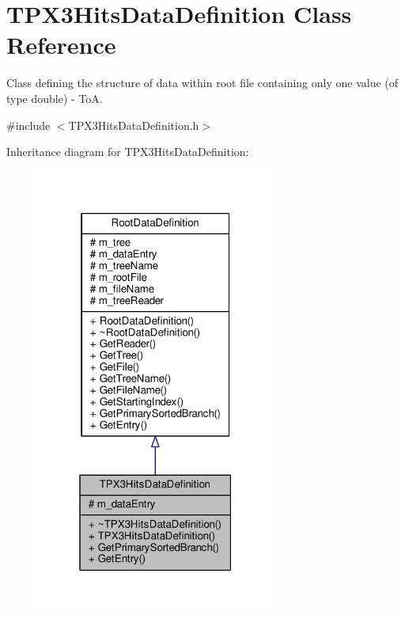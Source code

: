 \hypertarget{classTPX3HitsDataDefinition}{\section{T\+P\+X3\+Hits\+Data\+Definition Class Reference}
\label{classTPX3HitsDataDefinition}
}


Class defining the structure of data within root file containing only one value (of type double) -\/ To\+A.  




{\ttfamily \#include $<$T\+P\+X3\+Hits\+Data\+Definition.\+h$>$}



Inheritance diagram for T\+P\+X3\+Hits\+Data\+Definition\+:
\nopagebreak
\begin{figure}[H]
\begin{center}
\leavevmode
\includegraphics[width=223pt]{classTPX3HitsDataDefinition__inherit__graph}
\end{center}
\end{figure}


